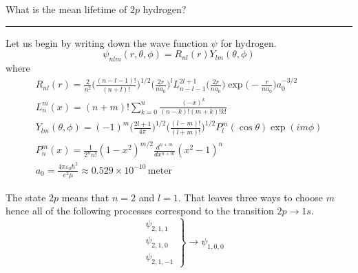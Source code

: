 \documentclass[12pt]{article}
\begin{document}
What is the mean lifetime of $2p$ hydrogen?

\bigskip
\hrule

\bigskip
Let us begin by writing down the wave function $\psi$ for hydrogen.
\begin{equation*}
\psi_{nlm}(r,\theta,\phi)=R_{nl}(r)Y_{lm}(\theta,\phi)
\end{equation*}
where
\begin{gather*}
R_{nl}(r)=
\frac{2}{n^2}
\bigg(\frac{(n-l-1)!}{(n+l)!}\bigg)^{1/2}
\bigg(\frac{2r}{na_0}\bigg)^l
L_{n-l-1}^{2l+1}\bigg(\frac{2r}{na_0}\bigg)
\exp\bigg(-\frac{r}{na_0}\bigg)
a_0^{-3/2}
\\[1ex]
L_n^m(x)=(n+m)!\sum_{k=0}^n\frac{(-x)^k}{(n-k)!(m+k)!k!}
\\[1ex]
Y_{lm}(\theta,\phi)=(-1)^m
\bigg(\frac{2l+1}{4\pi}\bigg)^{1/2}
\bigg(\frac{(l-m)!}{(l+m)!}\bigg)^{1/2}
P_l^m(\cos\theta)\exp(im\phi)
\\[1ex]
P_n^m(x)=\frac{1}{2^n n!}(1-x^2)^{m/2}\frac{d^{n+m}}{dx^{n+m}}(x^2-1)^n
\\[1ex]
a_0=\frac{4\pi\varepsilon_0\hbar^2}{e^2\mu}\approx0.529\times10^{-10}\,\text{meter}
\end{gather*}

The state $2p$ means that $n=2$ and $l=1$.
That leaves three ways to choose $m$ hence all of the following processes correspond to the transition
$2p\rightarrow1s$.
\begin{equation*}
\left.\begin{aligned}
&\psi_{2,1,1}
\\
&\psi_{2,1,0}
\\
&\psi_{2,1,-1}
\end{aligned}\right\}\rightarrow\psi_{1,0,0}
\end{equation*}
\end{document}
